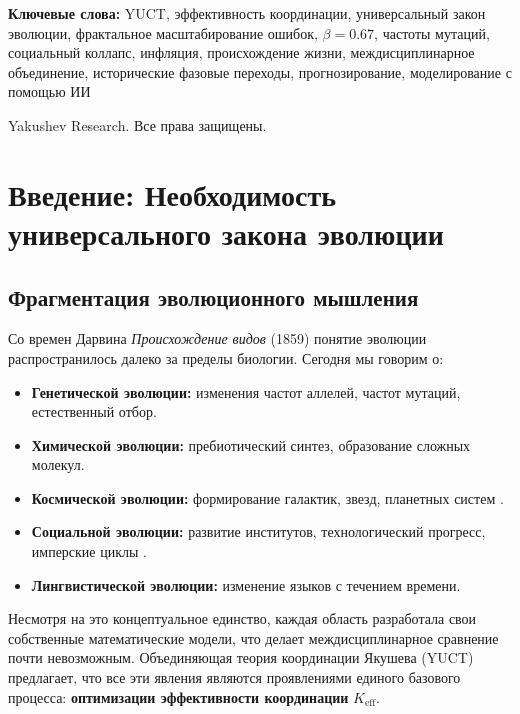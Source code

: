 \documentclass[12pt,a4paper]{article}
\theoremstyle{remark}
\newcommand{\Keff}{K_{\mathrm{eff}}}
\begin{document}
\begin{titlepage}
\begin{center}
			\vspace{1cm}
			
			\noindent
			\small\textbf{Ключевые слова:} YUCT, эффективность координации, универсальный закон эволюции, фрактальное масштабирование ошибок, $\beta=0.67$, частоты мутаций, социальный коллапс, инфляция, происхождение жизни, междисциплинарное объединение, исторические фазовые переходы, прогнозирование, моделирование с помощью ИИ
			
			\vspace{0.5cm}
			
			\noindent
			 Yakushev Research. Все права защищены.
		\end{center}
	\end{titlepage}
	
	\tableofcontents
	\newpage
	
	\section{Введение: Необходимость универсального закона эволюции}
	
	\subsection{Фрагментация эволюционного мышления}
	
	Со времен Дарвина \textit{Происхождение видов} (1859) \cite{Darwin1859} понятие эволюции распространилось далеко за пределы биологии. Сегодня мы говорим о:
	
	\begin{itemize}
		\item \textbf{Генетической эволюции:} изменения частот аллелей, частот мутаций, естественный отбор.
		\item \textbf{Химической эволюции:} пребиотический синтез, образование сложных молекул.
		\item \textbf{Космической эволюции:} формирование галактик, звезд, планетных систем \cite{Chaisson2001}.
		\item \textbf{Социальной эволюции:} развитие институтов, технологический прогресс, имперские циклы \cite{Boulding1978}.
		\item \textbf{Лингвистической эволюции:} изменение языков с течением времени.
	\end{itemize}
	
	Несмотря на это концептуальное единство, каждая область разработала свои собственные математические модели, что делает междисциплинарное сравнение почти невозможным. Объединяющая теория координации Якушева (YUCT) предлагает, что все эти явления являются проявлениями единого базового процесса: \textbf{оптимизации эффективности координации} $\Keff$.
	
\end{document}
